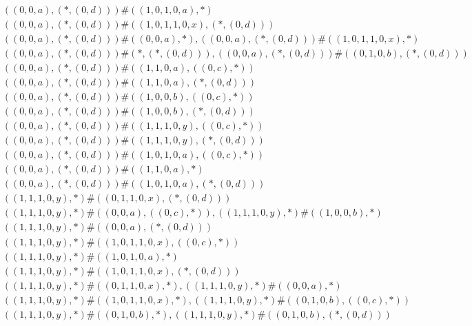 \begin{align*}
	 & \qquad ((0, 0, a), (*, (0, d))) \# ((1, 0, 1, 0, a), *) \\ 
	 & \qquad ((0, 0, a), (*, (0, d))) \# ((1, 0, 1, 1, 0, x), (*, (0, d))) \\ 
	 & \qquad ((0, 0, a), (*, (0, d))) \# ((0, 0, a), *), ((0, 0, a), (*, (0, d))) \# ((1, 0, 1, 1, 0, x), *) \\ 
	 & \qquad ((0, 0, a), (*, (0, d))) \# (*, (*, (0, d))), ((0, 0, a), (*, (0, d))) \# ((0, 1, 0, b), (*, (0, d))) \\ 
	 & \qquad ((0, 0, a), (*, (0, d))) \# ((1, 1, 0, a), ((0, c), *)) \\ 
	 & \qquad ((0, 0, a), (*, (0, d))) \# ((1, 1, 0, a), (*, (0, d))) \\ 
	 & \qquad ((0, 0, a), (*, (0, d))) \# ((1, 0, 0, b), ((0, c), *)) \\ 
	 & \qquad ((0, 0, a), (*, (0, d))) \# ((1, 0, 0, b), (*, (0, d))) \\ 
	 & \qquad ((0, 0, a), (*, (0, d))) \# ((1, 1, 1, 0, y), ((0, c), *)) \\ 
	 & \qquad ((0, 0, a), (*, (0, d))) \# ((1, 1, 1, 0, y), (*, (0, d))) \\ 
	 & \qquad ((0, 0, a), (*, (0, d))) \# ((1, 0, 1, 0, a), ((0, c), *)) \\ 
	 & \qquad ((0, 0, a), (*, (0, d))) \# ((1, 1, 0, a), *) \\ 
	 & \qquad ((0, 0, a), (*, (0, d))) \# ((1, 0, 1, 0, a), (*, (0, d))) \\ 
	 & \qquad ((1, 1, 1, 0, y), *) \# ((0, 1, 1, 0, x), (*, (0, d))) \\ 
	 & \qquad ((1, 1, 1, 0, y), *) \# ((0, 0, a), ((0, c), *)), ((1, 1, 1, 0, y), *) \# ((1, 0, 0, b), *) \\ 
	 & \qquad ((1, 1, 1, 0, y), *) \# ((0, 0, a), (*, (0, d))) \\ 
	 & \qquad ((1, 1, 1, 0, y), *) \# ((1, 0, 1, 1, 0, x), ((0, c), *)) \\ 
	 & \qquad ((1, 1, 1, 0, y), *) \# ((1, 0, 1, 0, a), *) \\ 
	 & \qquad ((1, 1, 1, 0, y), *) \# ((1, 0, 1, 1, 0, x), (*, (0, d))) \\ 
	 & \qquad ((1, 1, 1, 0, y), *) \# ((0, 1, 1, 0, x), *), ((1, 1, 1, 0, y), *) \# ((0, 0, a), *) \\ 
	 & \qquad ((1, 1, 1, 0, y), *) \# ((1, 0, 1, 1, 0, x), *), ((1, 1, 1, 0, y), *) \# ((0, 1, 0, b), ((0, c), *)) \\ 
	 & \qquad ((1, 1, 1, 0, y), *) \# ((0, 1, 0, b), *), ((1, 1, 1, 0, y), *) \# ((0, 1, 0, b), (*, (0, d))) \\ 

\end{align*}
